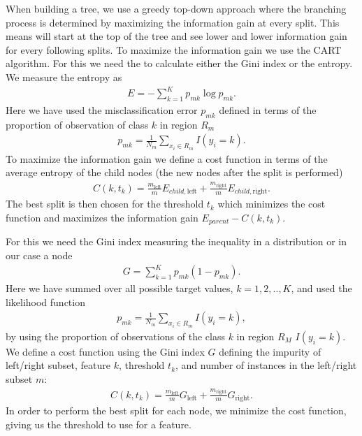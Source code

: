 \documentclass[11pt]{article}
\begin{document}
When building a tree, we use a greedy top-down approach where the branching process is determined by maximizing the information gain at every split. This means will start at the top of the tree and see lower and lower information gain for every following splits. To maximize the information gain we use the CART algorithm. For this we need the to calculate either the Gini index or the entropy. We measure the entropy as
\begin{align*}
    E = - \sum_{k=1}^K p_{mk}\log p_{mk}.
\end{align*}
Here we have used the misclassification error $p_{mk}$ defined in terms of the proportion of observation of class $k$ in region $R_m$
\begin{align*}
    p_{mk} = \frac{1 }{N_m }\sum_{x_i \in R_m} I (y_i = k).
\end{align*}
To maximize the information gain we define a cost function in terms of the average entropy of the child nodes (the new nodes after the split is performed)
\begin{align*}
    C(k, t_k ) = \frac{m_{\text{left}}}{m} E_{child,\text{left}} + \frac{m_{\text{right}}}{m}E_{child,\text{right}}.
\end{align*}
The best split is then chosen for the threshold $t_k$ which minimizes the cost function and maximizes the information gain $E_{parent} - C(k, t_k)$.


For this we need the Gini index measuring the inequality in a distribution or in our case a node
\begin{align*}
    G = \sum_{k=1}^K p_{mk}(1 - p_{mk}).
\end{align*}
Here we have summed over all possible target values, $k=1,2,..,K$, and used the likelihood function
\begin{align*}
    p_{mk} = \frac{1 }{N_m }\sum_{x_i \in R_m} I (y_i = k),
\end{align*}
by using the proportion of observations of the class $k$ in region $R_M$ $I(y_i = k)$.
We define a cost function using the Gini index $G$ defining the impurity of left/right subset, feature $k$, threshold $t_k$, and number of instances in the left/right subset $m$:
\begin{align*}
    C(k, t_k ) = \frac{m_{\text{left}}}{m} G_{\text{left}} + \frac{m_{\text{right}}}{m}G_{\text{right}}.
\end{align*}
In order to perform the best split for each node, we minimize the cost function, giving us the threshold to use for a feature.
\end{document}
